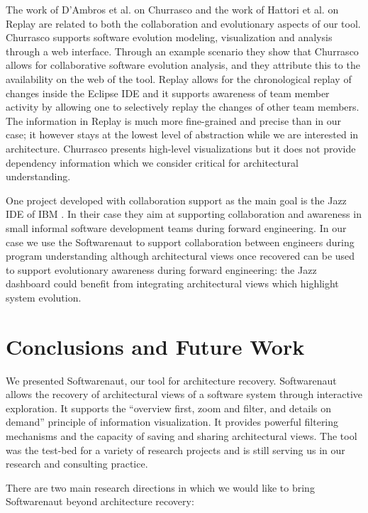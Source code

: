 \documentclass[preprint,12pt]{elsarticle}
\begin{document}
The work of D'Ambros et al. on Churrasco \cite{dambros-churrasco} and the work of Hattori et al.  on Replay \cite{hattori-replay} are related to both the collaboration and evolutionary aspects of our tool. Churrasco supports software evolution modeling, visualization and analysis through a web interface. Through an example scenario they show that Churrasco allows for collaborative software evolution analysis, and they attribute this to the availability on the web of the tool. Replay allows for the chronological replay of changes inside the Eclipse IDE and it supports awareness of team member activity by allowing one to selectively replay the changes of other team members. The information in Replay is much more fine-grained and precise than in our case; it however stays at the lowest level of abstraction while we are interested in architecture. Churrasco presents high-level visualizations but it does not provide dependency information which we consider critical for architectural understanding. 

One project developed with collaboration support as the main goal is the Jazz IDE of IBM \cite{hupfer-jazz}. 
In their case they aim at supporting collaboration and awareness in small informal software development teams during forward engineering. In our case we use the Softwarenaut to support collaboration between engineers during program understanding although architectural views once recovered can be used to support evolutionary awareness during forward engineering: the Jazz dashboard could benefit from integrating architectural views which highlight system evolution.

\section {Conclusions and Future Work} \label {sec:conc}

We presented Softwarenaut, our tool for architecture recovery. Softwarenaut allows the recovery of architectural views of a software system through interactive exploration. It supports the ``overview first, zoom and filter, and details on demand'' principle of information visualization. It provides powerful filtering mechanisms and the capacity of saving and sharing architectural views. The tool was the test-bed for a variety of research projects and is still serving us in our research and consulting practice. 

There are two main research directions in which we would like to bring Softwarenaut beyond architecture recovery:
\end{document}
